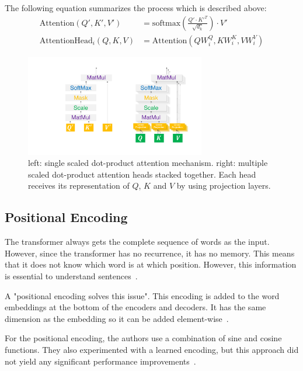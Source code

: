 The following equation summarizes the process which is described above:
\begin{align}
    \text{Attention}(Q', K', V') & = \text{softmax}(\frac{Q' \cdot K'^T}{\sqrt{d_k}}) \cdot V' \\
    \text{AttentionHead}_i(Q, K, V) & = \text{Attention}(QW_i^Q, KW_i^K, VW_i^V)
\end{align}

\begin{figure}[htp]
    \centering
    \includegraphics[width=0.7\textwidth]{figures/03_theory/03_transformer_ScaledDot}
    \caption{left: single scaled dot-product attention mechanism. right: multiple scaled dot-product attention heads stacked together. Each head receives its representation of $Q$, $K$ and $V$ by using projection layers.}
    \label{fig:03_transformer_scaledDotProduct}
\end{figure}

\subsection{Positional Encoding}

The transformer always gets the complete sequence of words as the input. However, since the transformer has no recurrence, it has no memory. This means that it does not know which word is at which position. However, this information is essential to understand sentences~\cite{Vaswani2017d}. 
\medskip

A "positional encoding solves this issue". This encoding is added to the word embeddings at the bottom of the encoders and decoders. It has the same dimension as the embedding so it can be added element-wise~\cite{Vaswani2017d}.

For the positional encoding, the authors use a combination of sine and cosine functions. They also experimented with a learned encoding, but this approach did not yield any significant performance improvements~\cite{Vaswani2017d}.

